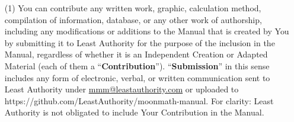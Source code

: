 \begin{itemize}
\item[(1)] You can contribute any written work, graphic, calculation method, compilation of information, database, or any other work of authorship, including any modifications or additions to the Manual that is created by You by submitting it to Least Authority for the purpose of the inclusion in the Manual, regardless of whether it is an Independent Creation or Adapted Material (each of them a ``\textbf{Contribution}''). ``\textbf{Submission}'' in this sense includes any form of electronic, verbal, or written communication sent to Least Authority under \href{mailto:mmm@leastauthority.com}{mmm@leastauthority.com} or uploaded to https://github.com/LeastAuthority/moonmath-manual. For clarity: Least Authority is not obligated to include Your Contribution in the Manual.


\end{itemize}
